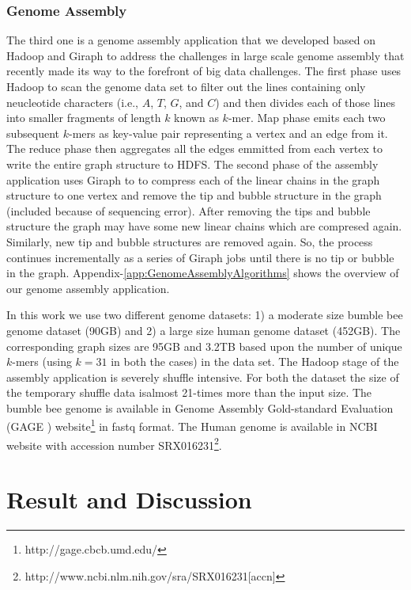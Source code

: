 \documentclass[journal]{IEEEtran}
\begin{document}
\subsubsection{Genome Assembly}
The third one is a genome assembly application that we developed based on Hadoop and Giraph to address the challenges in large scale genome assembly that recently made its way to the forefront of big data challenges. The first phase uses Hadoop to scan the genome data set to filter out the lines containing only neucleotide characters (i.e., $A$, $T$, $G$, and $C$) and then divides each of those lines into smaller fragments of length $k$ known as $k$-mer. Map phase emits each two subsequent $k$-mers as key-value pair representing a vertex and an edge from it. The reduce phase then aggregates all the edges emmitted from each vertex to write the entire graph structure to HDFS. The second phase of the assembly application uses Giraph to to compress each of the linear chains in the graph structure to one vertex and remove the tip and bubble structure in the graph (included because of sequencing error). After removing the tips and bubble structure the graph may have some new linear chains which are compresed again. Similarly, new tip and bubble structures are removed again. So, the process continues incrementally as a series of Giraph jobs until there is no tip or bubble in the graph. Appendix-\ref{app:GenomeAssemblyAlgorithms} shows the overview of our genome assembly application.

In this work we use two different genome datasets: 1) a moderate size bumble bee genome dataset (90GB) and 2) a large size human genome dataset (452GB). The corresponding graph sizes are 95GB and 3.2TB based upon the number of unique $k$-mers (using $k=31$ in both the cases) in the data set. The Hadoop stage of the assembly application is severely shuffle intensive. For both the dataset the size of the temporary shuffle data isalmost 21-times more than the input size. The bumble bee genome is available in Genome Assembly Gold-standard Evaluation (GAGE \cite{bio:gage}) website\footnote{http://gage.cbcb.umd.edu/} in fastq format. The Human genome is available in NCBI website with accession number SRX016231\footnote{http://www.ncbi.nlm.nih.gov/sra/SRX016231[accn]}.

\section{Result and Discussion}
\end{document}
